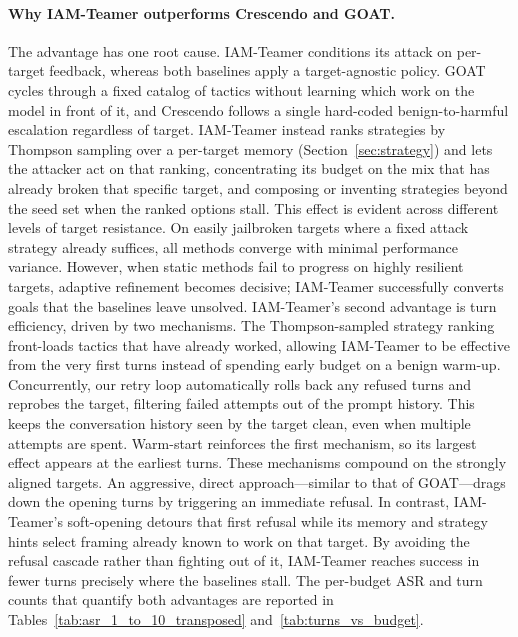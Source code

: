 \documentclass[a4paper,fleqn]{cas-sc}
\begin{document}
\paragraph{Why IAM-Teamer outperforms Crescendo and GOAT.}
The advantage has one root cause.
IAM-Teamer conditions its attack on per-target feedback, whereas both baselines apply a target-agnostic policy.
GOAT cycles through a fixed catalog of tactics without learning which work on the model in front of it, and Crescendo follows a single hard-coded benign-to-harmful escalation regardless of target.
IAM-Teamer instead ranks strategies by Thompson sampling over a per-target memory (Section~\ref{sec:strategy}) and lets the attacker act on that ranking, concentrating its budget on the mix that has already broken that specific target, and composing or inventing strategies beyond the seed set when the ranked options stall.
This effect is evident across different levels of target resistance.
On easily jailbroken targets where a fixed attack strategy already suffices, all methods converge with minimal performance variance.
However, when static methods fail to progress on highly resilient targets, adaptive refinement becomes decisive; IAM-Teamer successfully converts goals that the baselines leave unsolved.
IAM-Teamer's second advantage is turn efficiency, driven by two mechanisms.
The Thompson-sampled strategy ranking front-loads tactics that have already worked, allowing IAM-Teamer to be effective from the very first turns instead of spending early budget on a benign warm-up. Concurrently, our retry loop automatically rolls back any refused turns and reprobes the target, filtering failed attempts out of the prompt history. This keeps the conversation history seen by the target clean, even when multiple attempts are spent.
Warm-start reinforces the first mechanism, so its largest effect appears at the earliest turns.
These mechanisms compound on the strongly aligned targets.
An aggressive, direct approach---similar to that of GOAT---drags down the opening turns by triggering an immediate refusal.
In contrast, IAM-Teamer's soft-opening detours that first refusal while its memory and strategy hints select framing already known to work on that target.
By avoiding the refusal cascade rather than fighting out of it, IAM-Teamer reaches success in fewer turns precisely where the baselines stall.
The per-budget ASR and turn counts that quantify both advantages are reported in Tables~\ref{tab:asr_1_to_10_transposed} and~\ref{tab:turns_vs_budget}.
\end{document}
